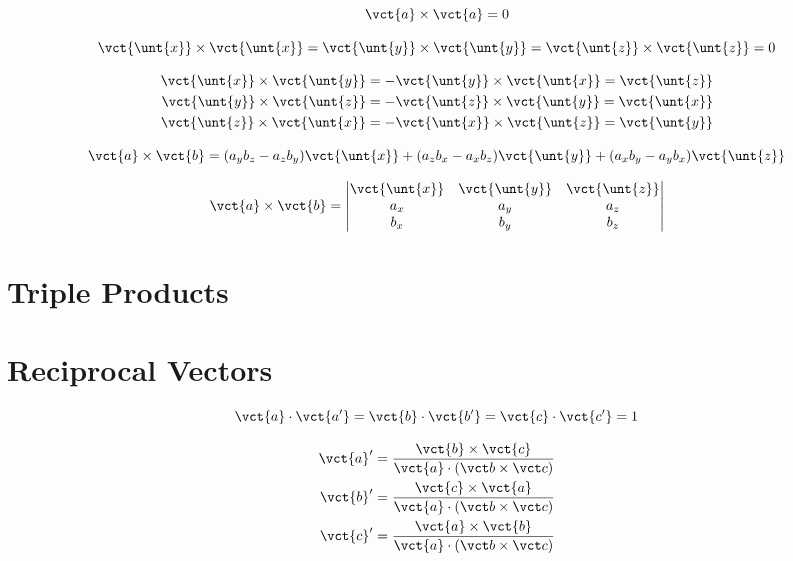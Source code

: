 \begin{equation*}
    \vct{a} \times \vct{a} = 0
\end{equation*}

\begin{equation*}
    \vct{\unt{x}} \times \vct{\unt{x}} =
    \vct{\unt{y}} \times \vct{\unt{y}} =
    \vct{\unt{z}} \times \vct{\unt{z}} = 0
\end{equation*}

\begin{align*}
    \vct{\unt{x}} \times \vct{\unt{y}} =
    - \vct{\unt{y}} \times \vct{\unt{x}} =
    \vct{\unt{z}}\\
    \vct{\unt{y}} \times \vct{\unt{z}} =
    -\vct{\unt{z}} \times \vct{\unt{y}} =
    \vct{\unt{x}}\\
    \vct{\unt{z}} \times \vct{\unt{x}} =
    -\vct{\unt{x}} \times \vct{\unt{z}} =
    \vct{\unt{y}}
\end{align*}

\begin{equation*}
    \vct{a} \times \vct{b} = (a_yb_z - a_zb_y)\vct{\unt{x}} + 
    (a_zb_x - a_xb_z)\vct{\unt{y}} + 
    (a_xb_y - a_yb_x)\vct{\unt{z}}
\end{equation*}

\begin{equation*}
    \vct{a} \times \vct{b} = 
    \begin{vmatrix}
        \vct{\unt{x}} & \vct{\unt{y}} & \vct{\unt{z}} \\ 
        a_x & a_y & a_z \\ 
        b_x & b_y & b_z \\ 
        \end{vmatrix}
\end{equation*}

\section{Triple Products}

\section{Reciprocal Vectors}

\begin{equation*}
    \vct{a} \cdot \vct{a'} = 
    \vct{b} \cdot \vct{b'} = 
    \vct{c} \cdot \vct{c'} = 1
\end{equation*}

\begin{align*}
    \vct{a}' &= \frac{\vct{b} \times \vct{c}}
    {\vct{a} \cdot (\vct b \times \vct c)}\\
    \vct{b}' &= \frac{\vct{c} \times \vct{a}}
    {\vct{a} \cdot (\vct b \times \vct c)}\\
    \vct{c}' &= \frac{\vct{a} \times \vct{b}}
    {\vct{a} \cdot (\vct b \times \vct c)}\\
\end{align*}